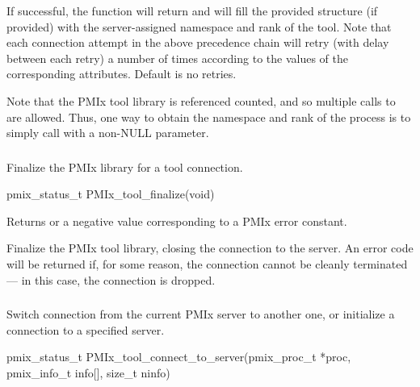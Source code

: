 If successful, the function will return  and will fill the provided structure (if provided) with the server-assigned namespace and rank of the tool. Note that each connection attempt in the above precedence chain will retry (with delay between each retry) a number of times according to the values of the corresponding attributes. Default is no retries.

Note that the \ac{PMIx} tool library is referenced counted, and so multiple calls to  are allowed.
Thus, one way to obtain the namespace and rank of the process is to simply call  with a non-NULL parameter.


\subsubsection{}

\summary

Finalize the \ac{PMIx} library for a tool connection.

\format

\cspecificstart
\begin{codepar}
pmix_status_t
PMIx_tool_finalize(void)
\end{codepar}
\cspecificend

Returns  or a negative value corresponding to a PMIx error constant.

\descr

Finalize the PMIx tool library, closing the connection to the server.
An error code will be returned if, for some reason, the connection cannot be cleanly terminated --- in this case, the connection is dropped.


\subsubsection{}

\summary

Switch connection from the current \ac{PMIx} server to another one, or initialize a connection to a specified server.

\format

\cspecificstart
\begin{codepar}
pmix_status_t
PMIx_tool_connect_to_server(pmix_proc_t *proc,
                            pmix_info_t info[], size_t ninfo)
\end{codepar}
\cspecificend

